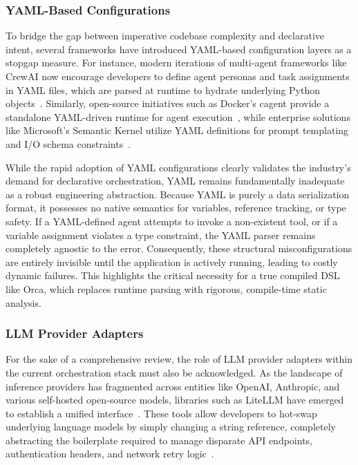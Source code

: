 \documentclass[sigconf,nonacm]{acmart}
\begin{document}
\subsubsection{YAML-Based Configurations}
\label{sec:background:yaml}

To bridge the gap between imperative codebase complexity and declarative
intent, several frameworks have introduced YAML-based configuration layers
as a stopgap measure. For instance, modern iterations of multi-agent
frameworks like CrewAI now encourage developers to define agent personas and
task assignments in YAML files, which are parsed at runtime to hydrate
underlying Python objects~\cite{docker2025cagent}. Similarly, open-source
initiatives such as Docker's cagent provide a standalone YAML-driven runtime
for agent execution~\cite{docker2025cagent}, while enterprise solutions
like Microsoft's Semantic Kernel utilize YAML definitions for prompt
templating and I/O schema constraints~\cite{docker2025cagent}.

While the rapid adoption of YAML configurations clearly validates the
industry's demand for declarative orchestration, YAML remains fundamentally
inadequate as a robust engineering abstraction. Because YAML is purely a
data serialization format, it possesses no native semantics for variables,
reference tracking, or type safety. If a YAML-defined agent attempts to
invoke a non-existent tool, or if a variable assignment violates a type
constraint, the YAML parser remains completely agnostic to the error.
Consequently, these structural misconfigurations are entirely invisible
until the application is actively running, leading to costly dynamic
failures. This highlights the critical necessity for a true compiled DSL like
Orca, which replaces runtime parsing with rigorous, compile-time static
analysis.

\subsubsection{LLM Provider Adapters}
\label{sec:background:adapters}

For the sake of a comprehensive review, the role of LLM provider adapters
within the current orchestration stack must also be acknowledged. As the
landscape of inference providers has fragmented across entities like
OpenAI, Anthropic, and various self-hosted open-source models, libraries
such as LiteLLM have emerged to establish a unified
interface~\cite{litellm2024}. These tools allow developers to hot-swap
underlying language models by simply changing a string reference, completely
abstracting the boilerplate required to manage disparate API endpoints,
authentication headers, and network retry logic~\cite{litellm2024}.
\end{document}
